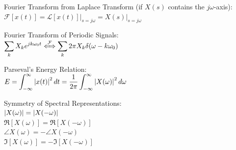 \documentclass[12pt,landscape,letterpaper]{article}
\newcommand{\tab}{\hspace{0.02\textwidth}}
\newcommand{\ds}{\displaystyle}
\begin{document}
\begin{multicols*}{3}
Fourier Transform from Laplace Transform (if $X(s)$ contains the $j\omega$-axis):\\
\tab $\mathcal{F}[x(t)] = \mathcal{L}[x(t)]\big\rvert_{s = j\omega} = X(s)\big\rvert_{s = j\omega}$

Fourier Transform of Periodic Signals:\\
\tab $\ds \sum_k X_k e^{jk\omega_0 t} \xLeftrightarrow{\mathcal{F}} \sum_k 2\pi X_k \delta(\omega - k\omega_0)$

Parseval's Energy Relation:\\
\tab $\ds E = \int_{-\infty}^{\infty} \abs{x(t)}^2\,dt = \frac{1}{2\pi}\int_{-\infty}^{\infty}\abs{X(\omega)}^2\,d\omega$

Symmetry of Spectral Representations:\\
\tab $\abs{X(\omega)} = \abs{X(-\omega)}$\\
\tab $\Re[X(\omega)] = \Re[X(-\omega)]$\\
\tab $\angle X(\omega) = -\angle X(-\omega)$\\
\tab $\Im[X(\omega)] = -\Im[X(-\omega)]$

\end{multicols*}
\end{document}
